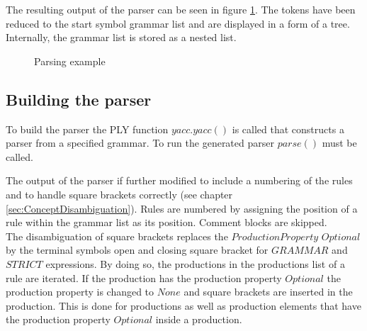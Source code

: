 The resulting output of the parser can be seen in figure \ref{fig:ImplementationParsing}. The tokens have been reduced to the start symbol grammar list and are displayed in a form of a tree. Internally, the grammar list is stored as a nested list.

\begin{figure}[H]
\caption{Parsing example}
\label{fig:ImplementationParsing}
\end{figure}
                
\subsection{Building the parser}\label{sec:ImplementationRunParser}

To build the parser the \ac{PLY} function $yacc.yacc()$ is called that constructs a parser from a specified grammar. To run the generated parser $parse()$ must be called. 

The output of the parser if further modified to include a numbering of the rules and to handle square brackets correctly (see chapter \ref{sec:ConceptDisambiguation}).
Rules are numbered by assigning the position of a rule within the grammar list as its position. Comment blocks are skipped. \\
The disambiguation of square brackets replaces the $ProductionProperty$ $Optional$ by the terminal symbols open and closing square bracket for $GRAMMAR$ and $STRICT$ expressions.
By doing so, the productions in the productions list of a rule are iterated. If the production has the production property $Optional$ the production property is changed to $None$ and square brackets are inserted in the production. This is done for productions as well as production elements that have the production property $Optional$ inside a production.


